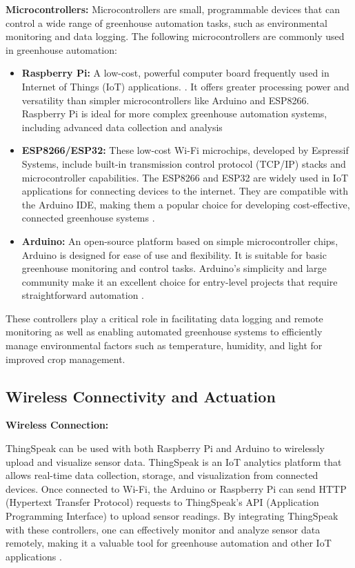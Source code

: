 \textbf{Microcontrollers:} Microcontrollers are small, programmable devices that can control a wide range of greenhouse automation tasks, such as environmental monitoring and data logging. The following microcontrollers are commonly used in greenhouse automation:

\begin{itemize}
    \item \textbf{Raspberry Pi:} A low-cost, powerful computer board frequently used in Internet of Things (IoT) applications. \citep{raspberrypi}. It offers greater processing power and versatility than simpler microcontrollers like Arduino and ESP8266. Raspberry Pi is ideal for more complex greenhouse automation systems, including advanced data collection and analysis 
    
    \item \textbf{ESP8266/ESP32:} These low-cost Wi-Fi microchips, developed by Espressif Systems, include built-in transmission control protocol (TCP/IP) stacks and microcontroller capabilities. The ESP8266 and ESP32 are widely used in IoT applications for connecting devices to the internet. They are compatible with the Arduino IDE, making them a popular choice for developing cost-effective, connected greenhouse systems \citep{esp_esp32}.
    
    \item \textbf{Arduino:} An open-source platform based on simple microcontroller chips, Arduino is designed for ease of use and flexibility. It is suitable for basic greenhouse monitoring and control tasks. Arduino's simplicity and large community make it an excellent choice for entry-level projects that require straightforward automation \citep{Yahaya2019}.
\end{itemize}

These controllers play a critical role in facilitating data logging and remote monitoring as well as enabling automated greenhouse systems to efficiently manage environmental factors such as temperature, humidity, and light for improved crop management.

\subsection{Wireless Connectivity and Actuation}

\textbf{Wireless Connection:}

ThingSpeak can be used with both Raspberry Pi and Arduino to wirelessly upload and visualize sensor data. ThingSpeak is an IoT analytics platform that allows real-time data collection, storage, and visualization from connected devices. Once connected to Wi-Fi, the Arduino or Raspberry Pi can send HTTP (Hypertext Transfer Protocol) requests to ThingSpeak's API (Application Programming Interface) to upload sensor readings. By integrating ThingSpeak with these controllers, one can effectively monitor and analyze sensor data remotely, making it a valuable tool for greenhouse automation and other IoT applications \citep{thingspeak}.

